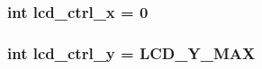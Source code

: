 \subsubsection[{lcd\_\-ctrl\_\-x}]{\setlength{\rightskip}{0pt plus 5cm}int {\bf lcd\_\-ctrl\_\-x} = 0}\label{lcd_8c_a1cc294e76003b0f360663bab284352bb}
\subsubsection[{lcd\_\-ctrl\_\-y}]{\setlength{\rightskip}{0pt plus 5cm}int {\bf lcd\_\-ctrl\_\-y} = LCD\_\-Y\_\-MAX}\label{lcd_8c_ab5728eedb69611680d9b2e95c449bea2}
